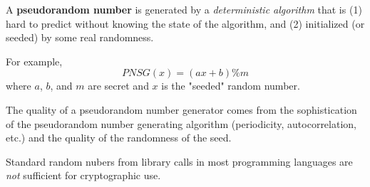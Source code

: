 \documentclass[titlepage, 12pt, leqno]{article}
\begin{document}
\begin{definition}
    A \textbf{pseudorandom number} is generated by a \textit{deterministic
    algorithm} that is (1) hard to predict without knowing the state of the
    algorithm, and (2) initialized (or seeded) by some real randomness.

    For example,
    \[
    PNSG(x) = (ax+b) \% m
    \]
    where $a$, $b$, and $m$ are secret and $x$ is the "seeded" random number.
\end{definition}

The quality of a pseudorandom number generator comes from the sophistication of
the pseudorandom number generating algorithm (periodicity, autocorrelation, etc.)
and the quality of the randomness of the seed.

\begin{note}
    Standard random nubers from library calls in most programming languages are
    \textit{not} sufficient for cryptographic use.
\end{note}
\end{document}
